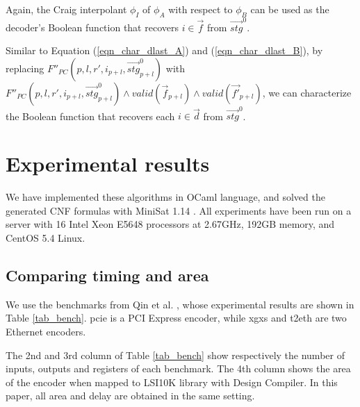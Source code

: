 \documentclass[conference]{IEEEtran}
\begin{document}
Again,
the Craig interpolant $\phi_I$ of $\phi_A$ with respect to $\phi_B$ 
can be used as the decoder's Boolean function that recovers $i\in\vec{f}$ from $\vec{stg}^0$.

Similar to Equation (\ref{eqn_char_dlast_A}) and (\ref{eqn_char_dlast_B}),
by replacing $F''_{PC}(p,l,r',i_{p+l},\vec{stg}^0_{p+l})$ with $F''_{PC}(p,l,r',i_{p+l},\vec{stg}^0_{p+l})\wedge valid(\vec{f}_{p+l})\wedge valid(\vec{f'}_{p+l})$,
we can characterize the Boolean function that recovers each $i\in\vec{d}$ from $\vec{stg}^0$.



\section{Experimental results}\label{sec_exp}
We have implemented these algorithms in OCaml language,
and solved the generated CNF formulas with MiniSat 1.14 \cite{EXTSAT}.
All experiments have been run on a server with 16 Intel Xeon E5648 processors at 2.67GHz, 
192GB memory, and CentOS 5.4 Linux.


\subsection{Comparing timing and area}
We use the benchmarks from Qin et al. \cite{QinTODAES15},
whose experimental results are shown in Table \ref{tab_bench}.
pcie is a PCI Express \cite{pcie} encoder,
while xgxs and t2eth are two Ethernet \cite{IEEE8023_S4} encoders.

The 2nd and 3rd column of Table \ref{tab_bench} show respectively the number of inputs, outputs and registers of each benchmark.
The 4th column shows the area of the encoder when mapped to LSI10K library with Design Compiler.
In this paper, 
all area and delay are obtained in the same setting.
\end{document}

